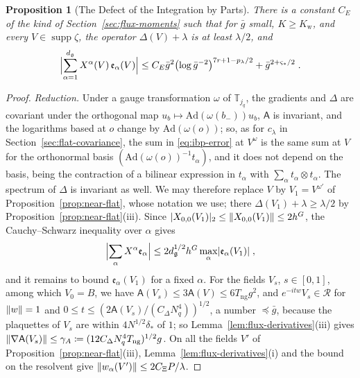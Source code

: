 \documentclass[11pt]{preprint}
\DeclarePairedDelimiter{\abs}{\lvert}{\rvert}
\DeclarePairedDelimiter{\norm}{\lVert}{\rVert}
\numberwithin{equation}{section}
\newtheorem{proposition}[theorem]{Proposition}
\theoremstyle{definition}
\theoremstyle{remark}
\theoremstyle{plain}
\begin{document}
\begin{proposition}[The Defect of the Integration by Parts]\label{prop:ibp-error}
There is a constant $C_E$ of the kind of Section~\ref{sec:flux-moments} such that for $\bar g$ small, $K \geq K_{\mathrm w}$, and every $V \in \operatorname{supp}\zeta$, the operator $\Delta(V) + \lambda$ is at least $\lambda/2$, and
\begin{equation}\label{eq:ibp-error}
    \Bigl\lvert\sum_{\alpha=1}^{d_{\mathfrak g}}X^\alpha(V)\,\mathfrak e_\alpha(V)\Bigr\rvert \leq C_E\bar g^2\bigl(\log\bar g^{-2}\bigr)^{7r+1-p_\lambda/2} + \bar g^{2+\varsigma_*/2}\;.
\end{equation}
\end{proposition}

\begin{proof}
\emph{Reduction.} Under a gauge transformation $\omega$ of $\mathbb T_{j_q}$, the gradients and $\Delta$ are covariant under the orthogonal map $u_b \mapsto \mathrm{Ad}(\omega(b_-))u_b$, $\mathsf A$ is invariant, and the logarithms based at $o$ change by $\mathrm{Ad}(\omega(o))$; so, as for $c_\lambda$ in Section~\ref{sec:flat-covariance}, the sum in \eqref{eq:ibp-error} at $V^\omega$ is the same sum at $V$ for the orthonormal basis $(\mathrm{Ad}(\omega(o))^{-1}t_\alpha)$, and it does not depend on the basis, being the contraction of a bilinear expression in $t_\alpha$ with $\sum_\alpha t_\alpha \otimes t_\alpha$. The spectrum of $\Delta$ is invariant as well. We may therefore replace $V$ by $V_1 = V^{\omega'}$ of Proposition~\ref{prop:near-flat}, whose notation we use; there $\Delta(V_1) + \lambda \geq \lambda/2$ by Proposition~\ref{prop:near-flat}(iii). Since $\abs{X_{0,0}(V_1)}_2 \leq \norm{X_{0,0}(V_1)} \leq 2h^G$, the Cauchy--Schwarz inequality over $\alpha$ gives
\begin{equation}\label{eq:ibp-error-reduction}
    \Bigl\lvert\sum_\alpha X^\alpha\mathfrak e_\alpha\Bigr\rvert \leq 2d_{\mathfrak g}^{1/2}h^G\max_\alpha\abs{\mathfrak e_\alpha(V_1)}\;,
\end{equation}
and it remains to bound $\mathfrak e_\alpha(V_1)$ for a fixed $\alpha$. For the fields $V_s$, $s \in [0, 1]$, among which $V_0 = B$, we have $\mathsf A(V_s) \leq 3\mathsf A(V) \leq 6T_{\mathrm{ng}}g^2$, and $e^{-itw}V_s \in \mathcal R$ for $\norm w = 1$ and $0 \leq t \leq (2\mathsf A(V_s)/(C_\Delta N_q^4))^{1/2}$, a number $\preceq \bar g$, because the plaquettes of $V_s$ are within $4N^{1/2}\delta_*$ of $1$; so Lemma~\ref{lem:flux-derivatives}(iii) gives $\norm{\nabla\mathsf A(V_s)} \leq \gamma_A \coloneqq (12C_\Delta N_q^4T_{\mathrm{ng}})^{1/2}g$. On all the fields $V'$ of Proposition~\ref{prop:near-flat}(iii), Lemma~\ref{lem:flux-derivatives}(i) and the bound on the resolvent give $\norm{w_\alpha(V')} \leq 2C_\Xi P/\lambda$.


\end{proof}
\end{document}
